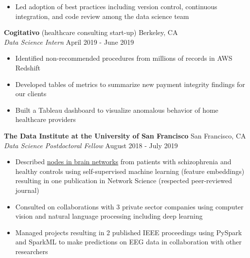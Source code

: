 \documentclass[line,margin,10pt]{res}
\begin{document}
\begin{resume}
\begin{itemize}
\item Led adoption of best practices including version control, continuous integration, and code review among the data science team
\end{itemize}
{\vspace{-0.25cm}}
\textbf{Cogitativo} (healthcare consulting start-up) \hfill Berkeley, CA\\
{\sl Data Science Intern} \hfill April 2019 - June 2019
\begin{itemize} \itemsep -2pt
\item Identified non-recommended procedures from millions of records in AWS Redshift
\item Developed tables of metrics to summarize new payment integrity findings for our clients
\item Built a Tableau dashboard to visualize anomalous behavior of home healthcare providers
\end{itemize}
{\vspace{-0.25cm}}
\textbf{The Data Institute at the University of San Francisco} \hfill San Francisco, CA \\
{\sl Data Science Postdoctoral Fellow} \hfill August 2018 - July 2019
\begin{itemize} \itemsep -2pt
\item Described \href{https://www.youtube.com/watch?v=8Ng_aMgIZLw&feature=youtu.be}{nodes in brain networks} from patients with schizophrenia and healthy controls using self-supervised machine learning (feature embeddings) resulting in one publication in Network Science (respected peer-reviewed journal)
\item Consulted on collaborations with 3 private sector companies using computer vision and natural language processing including deep learning
\item Managed projects resulting in 2 published IEEE proceedings using PySpark and SparkML to make predictions on EEG data in collaboration with other researchers

\end{itemize}
\end{resume}
\end{document}
